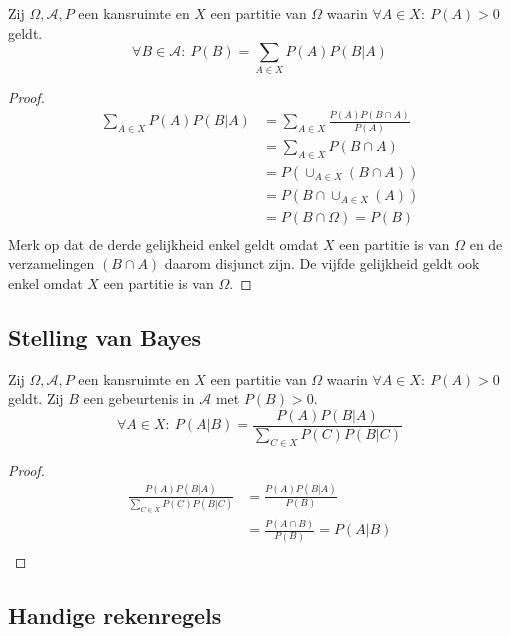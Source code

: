 \documentclass[main.tex]{subfiles}
\begin{document}
\begin{st}
  Zij $\Omega,\mathcal{A},P$ een kansruimte en $X$ een partitie van $\Omega$ waarin $\forall A \in X:\ P(A) > 0$ geldt.
  \[ \forall B \in \mathcal{A}:\ P(B) = \sum_{A\in X}P(A)P(B|A) \]
  \begin{proof}
    \[
    \begin{array}{rl}
      \sum_{A\in X}P(A)P(B|A)
      &= \sum_{A\in X}\frac{P(A)P(B \cap A)}{P(A)}\\
      &= \sum_{A\in X} P(B \cap A)\\
      &= P(\cup_{A\in X}(B \cap A))\\
      &= P(B \cap \cup_{A\in X}(A))\\
      &= P(B \cap \Omega) = P(B)\\
    \end{array}
    \]
    Merk op dat de derde gelijkheid enkel geldt omdat $X$ een partitie is van $\Omega$ en de verzamelingen $(B \cap A)$ daarom disjunct zijn.
    De vijfde gelijkheid geldt ook enkel omdat $X$ een partitie is van $\Omega$.
   \end{proof}
\end{st}

\subsection{Stelling van Bayes}
\label{sec:stelling-van-bayes}

\begin{st}
  \label{st:bayes}
  Zij $\Omega,\mathcal{A},P$ een kansruimte en $X$ een partitie van $\Omega$ waarin $\forall A \in X:\ P(A) > 0$ geldt.
  Zij $B$ een gebeurtenis in $\mathcal{A}$ met $P(B) > 0$.
  \[ \forall A\in X:\ P(A|B) = \frac{P(A)P(B|A)}{\sum_{C\in X}P(C)P(B|C)} \]
  \begin{proof}
    \[
      \begin{array}{rl}
        \frac{P(A)P(B|A)}{\sum_{C\in X}P(C)P(B|C)}
        &= \frac{P(A)P(B|A)}{P(B)}\\
        &= \frac{P(A \cap B)}{P(B)} = P(A|B)\\
      \end{array}
    \]
  \end{proof}
\end{st}

\subsection{Handige rekenregels}
\label{sec:handige-rekenregels}
\end{document}
